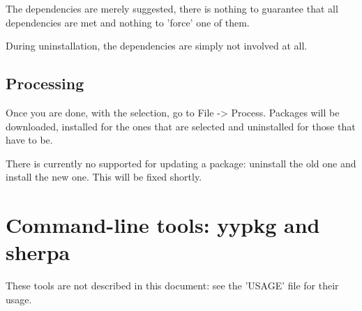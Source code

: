 \documentclass[a4paper]{article}
\begin{document}
The dependencies are merely suggested, there is nothing to guarantee that all dependencies are met and nothing to 'force' one of them.

During uninstallation, the dependencies are simply not involved at all.

\subsection{Processing}
Once you are done, with the selection, go to File -> Process. Packages will be downloaded, installed for the ones that are selected and uninstalled for those that have to be.

There is currently no supported for updating a package: uninstall the old one and install the new one. This will be fixed shortly.

\section{Command-line tools: yypkg and sherpa}
These tools are not described in this document: see the 'USAGE' file for their usage.
\end{document}
